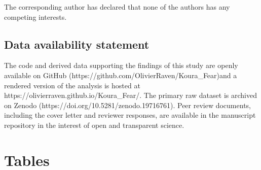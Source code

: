 \documentclass[
  12pt,
  a4paper,
  oneside]{scrbook}
\newcounter{none} %
\begin{document}
The corresponding author has declared that none of the authors has any
competing interests.

\subsection{Data availability
statement}\label{data-availability-statement}

The code and derived data supporting the findings of this study are
openly available on GitHub
(https://github.com/OlivierRaven/Koura\_Fear)and a rendered version of
the analysis is hosted at https://olivierraven.github.io/Koura\_Fear/.
The primary raw dataset is archived on Zenodo
(https://doi.org/10.5281/zenodo.19716761). Peer review documents,
including the cover letter and reviewer responses, are available in the
manuscript repository in the interest of open and transparent science.

\section{Tables}\label{tables}
\end{document}
